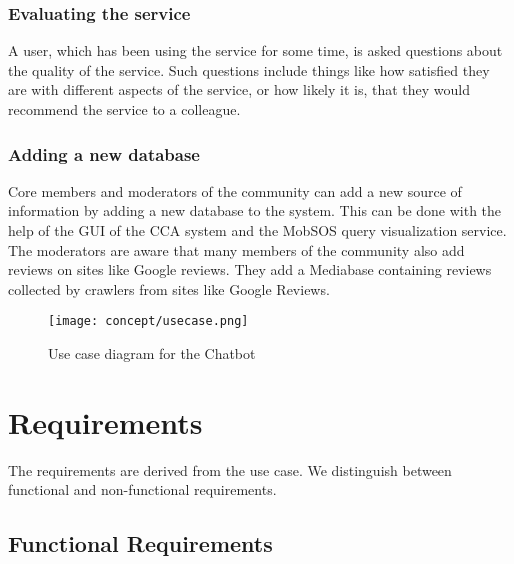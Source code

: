\subsubsection{Evaluating the service} A user, which has been using the service for some time, is asked questions about the quality of the service. Such questions include things like how satisfied they are with different aspects of the service, or how likely it is, that they would recommend the service to a colleague.

\subsubsection{Adding a new database} Core members and moderators of the community can add a new source of information by adding a new database to the system. This can be done with the help of the GUI of the CCA system and the MobSOS query visualization service.
The moderators are aware that many members of the community also add reviews on sites like Google reviews. 
They add a Mediabase containing reviews collected by crawlers from sites like Google Reviews.


\begin{figure}
    \centering
    \texttt{[image: concept/usecase.png]}
    \caption{Use case diagram for the Chatbot}
\end{figure}

\section{Requirements}
The requirements are derived from the use case. We distinguish between functional and non-functional requirements.
\subsection{Functional Requirements}

